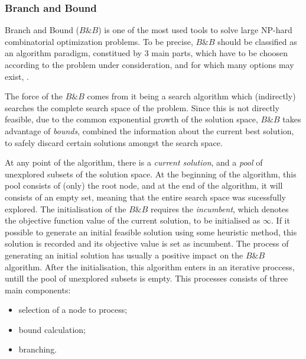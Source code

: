\subsubsection{Branch and Bound}
\label{sec:bnb}

Branch and Bound ($B\&B$) is one of the most used tools to solve large NP-hard combinatorial optimization problems.
To be precise, $B\&B$ should be classified as an algorithm paradigm, constitued by 3 main parts, 
which have to be choosen according to the problem under consideration, and for which many options may exist, \cite{bnb_review}.

The force of the $B\&B$ comes from it being a search algorithm which (indirectly) searches the complete search space of the problem.
Since this is not directly feasible, due to the common exponential growth of the solution space,
$B\&B$ takes advantage of \textit{bounds}, combined the information about the current best solution,
to safely discard certain solutions amongst the search space.

At any point of the algorithm, there is a \textit{current solution}, and a \textit{pool} of unexplored subsets 
of the solution space. At the beginning of the algorithm, this pool consists of (only) the root node,
and at the end of the algorithm, it will consists of an empty set, meaning that the entire search space was sucessfully explored.
The initialisation of the $B\&B$ requires the \textit{incumbent}, which denotes the objective function value of the current solution,
to be initialised as $\infty$. If it possible to generate an initial feasible solution using some heuristic method,
this solution is recorded and its objective value is set as incumbent. 
The process of generating an initial solution has usually a positive impact on the $B\&B$ algorithm.
After the initialisation, this algorithm enters in an iterative proccess, untill the pool of unexplored subsets is empty.
This processes consists of three main components: 

\begin{itemize}
  \item selection of a node to process;
  \item bound calculation;
  \item branching.
\end{itemize}

